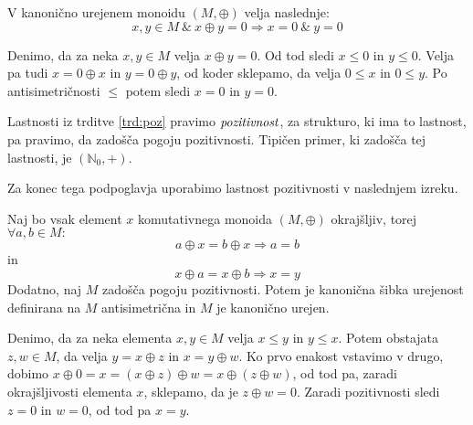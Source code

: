 \documentclass[mat1]{fmfdelo}
\newcommand{\N}{\mathbb{N}}
\newcommand{\No}{\N_0}
\newcommand{\pojem}[1]{\ensuremath{\emph{#1}}}
\begin{document}
\begin{trditev}\label{trd:poz}
	V kanonično urejenem monoidu $(M, \oplus)$ velja naslednje: $$x, y \in M ~\&~ x\oplus y = 0 \Rightarrow x = 0 ~\& ~ y = 0$$
\end{trditev}
\begin{dokaz}
	Denimo, da za neka $x, y\in M$ velja $x \oplus y = 0$. Od tod sledi $x\leq 0$ in $y \leq 0$. Velja pa tudi $x = 0 \oplus x$ in $y = 0 \oplus y$, od koder sklepamo, da velja $0 \leq x$ in $0 \leq y$. Po antisimetričnosti $\leq$ potem sledi $x = 0$ in $y = 0$.
\end{dokaz}

\begin{opomba}
	\label{opomb:poz}
	Lastnosti iz trditve \ref{trd:poz} pravimo \pojem{pozitivnost}, za strukturo, ki ima to lastnost, pa pravimo, da zadošča pogoju pozitivnosti. Tipičen primer, ki zadošča tej lastnosti, je $(\No, +)$. 
\end{opomba}

Za konec tega podpoglavja uporabimo lastnost pozitivnosti v naslednjem izreku.
\begin{izrek}\label{izr:poz}
Naj bo vsak element $x$ komutativnega monoida $(M, \oplus)$ okrajšljiv, torej $\forall a, b\in M:$ $$a\oplus x = b\oplus x \Rightarrow a = b$$ in $$x\oplus a = x\oplus b \Rightarrow x = y$$ Dodatno, naj $M$ zadošča pogoju pozitivnosti. Potem je kanonična šibka urejenost definirana na $M$ antisimetrična in $M$ je kanonično urejen.
\end{izrek}
\begin{dokaz} Denimo, da za neka elementa $x, y\in M$ velja $x\leq y$ in $y\leq x$. Potem obstajata $z, w\in M$, da velja $y = x \oplus z$ in $x = y \oplus w$. Ko prvo enakost vstavimo v drugo, dobimo $x \oplus 0 = x = (x \oplus z) \oplus w = x \oplus (z\oplus w)$, od tod pa, zaradi okrajšljivosti elementa $x$, sklepamo, da je $z\oplus w = 0$. Zaradi pozitivnosti sledi $z = 0$ in $w = 0$, od tod pa $x = y$.
\end{dokaz}
\end{document}
